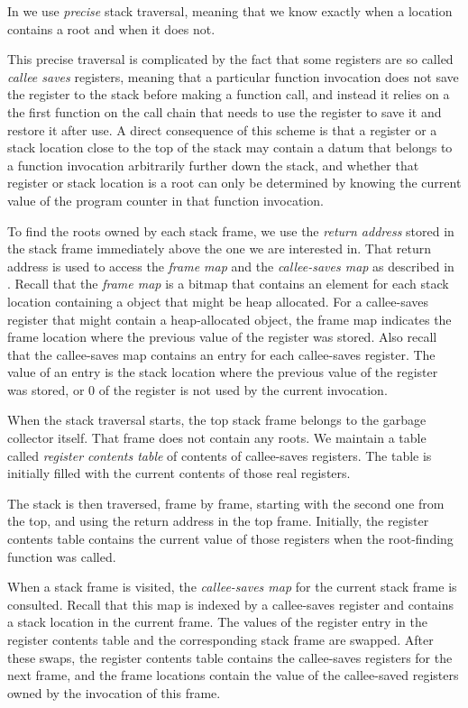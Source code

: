 In \sysname{} we use \emph{precise} stack traversal, meaning that we
know exactly when a location contains a root and when it does not.

This precise traversal is complicated by the fact that some registers
are so called \emph{callee saves} registers, meaning that a particular
function invocation does not save the register to the stack before
making a function call, and instead it relies on a the first function
on the call chain that needs to use the register to save it and
restore it after use.  A direct consequence of this scheme is that a
register or a stack location close to the top of the stack may contain
a datum that belongs to a function invocation arbitrarily further down
the stack, and whether that register or stack location is a root can
only be determined by knowing the current value of the program counter
in that function invocation.

To find the roots owned by each stack frame, we use the \emph{return
  address} stored in the stack frame immediately above the one we are
interested in.  That return address is used to access the \emph{frame
  map} and the \emph{callee-saves map} as described in
.  Recall that the
\emph{frame map} is a bitmap that contains an element for each stack
location containing a \commonlisp{} object that might be heap
allocated.  For a callee-saves register that might contain a
heap-allocated \commonlisp{} object, the frame map indicates the frame
location where the previous value of the register was stored.  Also
recall that the callee-saves map contains an entry for each
callee-saves register.  The value of an entry is the stack location
where the previous value of the register was stored, or $0$ of the
register is not used by the current invocation.

When the stack traversal starts, the top stack frame belongs to the
garbage collector itself.  That frame does not contain any roots.  We
maintain a table called \emph{register contents table} of contents of
callee-saves registers.  The table is initially filled with the
current contents of those real registers.

The stack is then traversed, frame by frame, starting with the second
one from the top, and using the return address in the top frame.
Initially, the register contents table contains the current value of
those registers when the root-finding function was called.

When a stack frame is visited, the \emph{callee-saves map} for the
current stack frame is consulted.  Recall that this map is indexed by
a callee-saves register and contains a stack location in the current
frame.  The values of the register entry in the register contents
table and the corresponding stack frame are swapped.  After these
swaps, the register contents table contains the callee-saves
registers for the next frame, and the frame locations contain the
value of the callee-saved registers owned by the invocation of this
frame.

